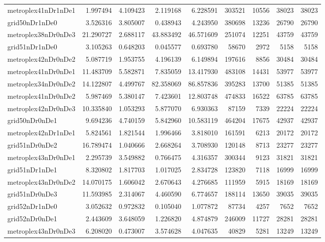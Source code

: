 \begin{longtable}{|l|r|r|r|r|r|r|r|r|}
metroplex41nDr1nDe1 & 1.997494 & 4.109423 & 2.119168 & 6.228591 & 303521 & 10556 & 38023 & 38023 \\
grid50nDr1nDe0 & 3.526316 & 3.805007 & 0.438943 & 4.243950 & 380698 & 13236 & 26790 & 26790 \\
metroplex38nDr0nDe3 & 21.290727 & 2.688117 & 43.883492 & 46.571609 & 251074 & 12251 & 43759 & 43759 \\
grid51nDr1nDe0 & 3.105263 & 0.648203 & 0.045577 & 0.693780 & 58670 & 2972 & 5158 & 5158 \\
metroplex42nDr0nDe2 & 5.087719 & 1.953755 & 4.196139 & 6.149894 & 197616 & 8856 & 30484 & 30484 \\
metroplex41nDr0nDe1 & 11.483709 & 5.582871 & 7.835059 & 13.417930 & 483108 & 14431 & 53977 & 53977 \\
metroplex34nDr0nDe2 & 14.122807 & 4.499767 & 82.358069 & 86.857836 & 395283 & 13700 & 51385 & 51385 \\
metroplex41nDr0nDe2 & 5.987469 & 5.380147 & 7.423601 & 12.803748 & 474833 & 16522 & 63785 & 63785 \\
metroplex42nDr0nDe3 & 10.335840 & 1.053293 & 5.877070 & 6.930363 & 87159 & 7339 & 22224 & 22224 \\
grid50nDr0nDe1 & 9.694236 & 4.740159 & 5.842960 & 10.583119 & 464204 & 17675 & 42937 & 42937 \\
metroplex42nDr1nDe1 & 5.824561 & 1.821544 & 1.996466 & 3.818010 & 161591 & 6213 & 20172 & 20172 \\
grid51nDr0nDe2 & 16.789474 & 1.040666 & 2.668264 & 3.708930 & 120148 & 8713 & 23277 & 23277 \\
metroplex43nDr0nDe1 & 2.295739 & 3.549882 & 0.766475 & 4.316357 & 300344 & 9123 & 31821 & 31821 \\
grid51nDr1nDe1 & 8.320802 & 1.817703 & 1.017025 & 2.834728 & 123820 & 7118 & 16999 & 16999 \\
metroplex43nDr0nDe2 & 14.070175 & 1.606042 & 2.670643 & 4.276685 & 111959 & 5915 & 18169 & 18169 \\
grid51nDr0nDe3 & 11.593985 & 2.314067 & 4.460590 & 6.774657 & 188114 & 13650 & 39035 & 39035 \\
grid52nDr1nDe0 & 3.052632 & 0.972832 & 0.105040 & 1.077872 & 87734 & 4257 & 7652 & 7652 \\
grid52nDr0nDe1 & 2.443609 & 3.648059 & 1.226820 & 4.874879 & 246009 & 11727 & 28281 & 28281 \\
metroplex43nDr0nDe3 & 6.208020 & 0.473007 & 3.574628 & 4.047635 & 40829 & 5281 & 13249 & 13249 \\

\end{longtable}

